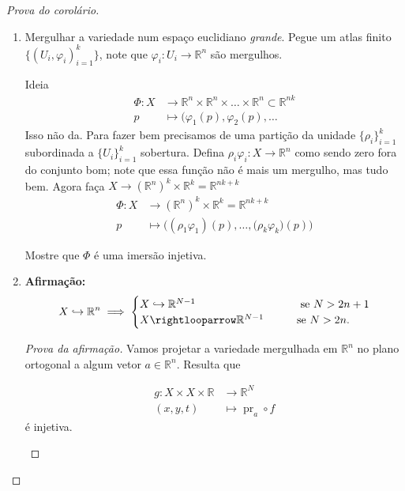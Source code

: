 \begin{proof}[Prova do corolário]\leavevmode
\begin{enumerate}[label=\textbf{Step \arabic*}]
\item Mergulhar a variedade num espaço euclidiano \textit{grande}. Pegue um atlas finito \(\{(U_i,\varphi_i)_{i=1}^k\}\), note que \(\varphi_i:U_i \to \mathbb{R}^n\) são mergulhos.

\begin{thing6}{Ideia}\leavevmode
\begin{align*}
	\Phi: X &\longrightarrow \mathbb{R}^n\times \mathbb{R}^n \times\ldots\times \mathbb{R}^n \subset \mathbb{R}^{nk} \\
	p &\longmapsto (\varphi_1(p),\varphi_2(p),\ldots
\end{align*}
Isso não da. Para fazer bem precisamos de uma partição da unidade \(\{\rho_i\}_{i=1}^k\) subordinada a \(\{U_i\}_{i=1}^k\) sobertura. Defina \(\rho_i\varphi_i:X \to \mathbb{R}^n\) como sendo zero fora do conjunto bom; note que essa função não é mais um mergulho, mas tudo bem. Agora faça \(X \to (\mathbb{R}^n)^k\times \mathbb{R}^k=\mathbb{R}^{nk+k}\)
\begin{align*}
	\Phi: X &\longrightarrow (\mathbb{R}^n)^k \times\mathbb{R}^k = \mathbb{R}^{nk+k} \\
	p &\longmapsto \Big((\rho_1 \varphi_1)(p),\ldots,\Big(\rho_k \varphi_k)(p)\Big)
\end{align*}
\begin{exercise}[Importante]\leavevmode
	Mostre que \(\Phi\) é uma imersão injetiva.
\end{exercise}
\end{thing6}

\item \textbf{Afirmação:}
	\[X \hookrightarrow  \mathbb{R}^n \implies \begin{cases}
		X \hookrightarrow \mathbb{R}^{N-1}\qquad &\text{ se $N>2n+1$}  \\
		X \rightlooparrow \mathbb{R}^{N-1} \qquad &\text{se $N>2n$.} 
	\end{cases}\]
\begin{proof}[Prova da afirmação]\leavevmode
Vamos projetar a variedade mergulhada em \(\mathbb{R}^n\) no plano ortogonal a algum vetor \(a \in \mathbb{R}^n\). Resulta que
\begin{exercise}\leavevmode
	\begin{align*}
	g: X \times X \times \mathbb{R} &\longrightarrow \mathbb{R}^N \\
	(x,y,t) &\longmapsto \operatorname{pr}_a \circ f
\end{align*}
é injetiva.
\end{exercise}
\end{proof}


\end{enumerate}
\end{proof}
